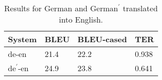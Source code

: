 \begin{table}[!h]
\center 
{
	\begin{tabular}{|l|l|l|l|}
	\hline
	System        & BLEU  & BLEU-cased & TER   \\ \hline
	de-en & 21.4  & 22.2       & 0.938 \\ \hline
	de$^\prime$-en      & 24.9  & 23.8       & 0.641 \\ \hline
	\end{tabular}
}
\caption{Results for German and German$^\prime$ translated into English.}
\label{tab:deen}
\end{table}